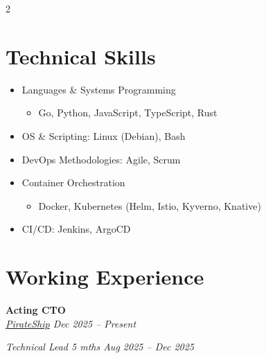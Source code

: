 \documentclass[a4paper,11pt]{article}
\newcommand{\entryHeader}[2]{\noindent\textbf{#1} \\ \textit{#2}}
\newcommand{\roleEntry}[1]{\noindent\textit{#1}}
\begin{document}
\begin{multicols}{2}
\section*{Technical Skills}
\begin{itemize}
    \item Languages \& Systems Programming
    \begin{itemize}
        \item Go, Python, JavaScript, TypeScript, Rust
    \end{itemize}
    \item OS \& Scripting: Linux (Debian), Bash
    \item DevOps Methodologies: Agile, Scrum
    \item Container Orchestration
    \begin{itemize}
        \item Docker, Kubernetes (Helm, Istio, Kyverno, Knative)
    \end{itemize}
    \item CI/CD: Jenkins, ArgoCD
\end{itemize}

\columnbreak

\section*{Working Experience}
\entryHeader{Acting CTO}{\href{https://sg.linkedin.com/company/thepirateship}{PirateShip} \hfill Dec 2025 -- Present}

\roleEntry{\textup{Technical Lead} \hfill 5 mths \textbar{} Aug 2025 -- Dec 2025}
 

\end{multicols}
\end{document}
